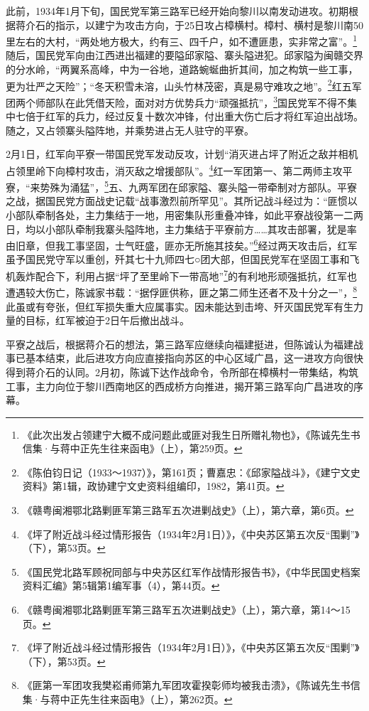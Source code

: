 此前，1934年1月下旬，国民党军第三路军已经开始向黎川以南发动进攻。初期根据蒋介石的指示，以建宁为攻击方向，于25日攻占樟横村。樟村、横村是黎川南50里左右的大村，“两处地方极大，约有三、四千户，如不遭匪患，实非常之富”。\footnote{《此次出发占领建宁大概不成问题此或匪对我生日所赠礼物也》，《陈诚先生书信集·与蒋中正先生往来函电》（上），第259页。}随后，国民党军向由江西进出福建的要隘邱家隘、寨头隘进犯。邱家隘为闽赣交界的分水岭，“两翼系高峰，中为一谷地，道路蜿蜒曲折其间，加之构筑一些工事，更为壮严之天险”；“冬天积雪未溶，山头竹林茂密，真是易守难攻之地”。\footnote{《陈伯钧日记（1933～1937）》，第161页；曹嘉忠：《邱家隘战斗》，《建宁文史资料》第1辑，政协建宁文史资料组编印，1982，第41页。}红五军团两个师部队在此凭借天险，面对对方优势兵力“顽强抵抗”，\footnote{《赣粤闽湘鄂北路剿匪军第三路军五次进剿战史》（上），第六章，第6页。}国民党军不得不集中七倍于红军的兵力，经过反复十数次冲锋，付出重大伤亡后才将红军迫出战场。随之，又占领寨头隘阵地，并乘势进占无人驻守的平寮。


2月1日，红军向平寮一带国民党军发动反攻，计划“消灭进占坪了附近之敌并相机占领里岭下向樟村攻击，消灭敌之增援部队”。\footnote{《坪了附近战斗经过情形报告（1934年2月1日）》，《中央苏区第五次反“围剿”》（下），第53页。}红一军团第一、第二两师主攻平寮，“来势殊为涌猛”，\footnote{《国民党北路军顾祝同部与中央苏区红军作战情形报告书》，《中华民国史档案资料汇编》第5辑第1编军事（4），第44页。}五、九两军团在邱家隘、寨头隘一带牵制对方部队。平寮之战，据国民党方面战史记载“战事激烈前所罕见”。其所记战斗经过为：“匪惯以小部队牵制各处，主力集结于一地，用密集队形重叠冲锋，如此平寮战役第一二两日，均以小部队牵制我寨头隘阵地，主力集结于平寮前方……其攻击部署，犹是率由旧章，但我工事坚固，士气旺盛，匪亦无所施其技矣。”\footnote{《赣粤闽湘鄂北路剿匪军第三路军五次进剿战史》（上），第六章，第14～15页。}经过两天攻击后，红军虽予国民党守军以重创，歼其七十九师四七○团大部，但国民党军在坚固工事和飞机轰炸配合下，利用占据“坪了至里岭下一带高地”\footnote{《坪了附近战斗经过情形报告（1934年2月1日）》，《中央苏区第五次反“围剿”》（下），第53页。}的有利地形顽强抵抗，红军也遭遇较大伤亡，陈诚家书载：“据俘匪供称，匪之第二师生还者不及十分之一”，\footnote{《匪第一军团攻我樊崧甫师第九军团攻霍揆彰师均被我击溃》，《陈诚先生书信集·与蒋中正先生往来函电》（上），第262页。}此虽或有夸张，但红军损失重大应属事实。因未能达到击垮、歼灭国民党军有生力量的目标，红军被迫于2日午后撤出战斗。


平寮之战后，根据蒋介石的想法，第三路军应继续向福建挺进，但陈诚认为福建战事已基本结束，此后进攻方向应直接指向苏区的中心区域广昌，这一进攻方向很快得到蒋介石的认同。2月初，陈诚下达作战命令，令所部在樟横村一带集结，构筑工事，主力向位于黎川西南地区的西成桥方向推进，揭开第三路军向广昌进攻的序幕。


